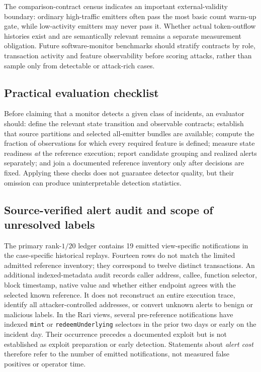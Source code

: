 \documentclass[preprint,12pt,authoryear]{elsarticle}
\begin{document}
The comparison-contract census indicates an important external-validity boundary: ordinary high-traffic emitters often pass the most basic count warm-up gate, while low-activity emitters may never pass it. Whether actual token-outflow histories exist and are semantically relevant remains a separate measurement obligation. Future software-monitor benchmarks should stratify contracts by role, transaction activity and feature observability before scoring attacks, rather than sample only from detectable or attack-rich cases.

\subsection{Practical evaluation checklist}
Before claiming that a monitor detects a given class of incidents, an evaluator should: define the relevant state transition and observable contracts; establish that source partitions and selected all-emitter bundles are available; compute the fraction of observations for which every required feature is defined; measure state readiness \emph{at} the reference execution; report candidate grouping and realized alerts separately; and join a documented reference inventory only after decisions are fixed. Applying these checks does not guarantee detector quality, but their omission can produce uninterpretable detection statistics.

\subsection{Source-verified alert audit and scope of unresolved labels}
The primary rank-$1/20$ ledger contains 19 emitted view-specific notifications in the case-specific historical replays. Fourteen rows do not match the limited admitted reference inventory; they correspond to twelve distinct transactions. An additional indexed-metadata audit records caller address, callee, function selector, block timestamp, native value and whether either endpoint agrees with the selected known reference. It does not reconstruct an entire execution trace, identify all attacker-controlled addresses, or convert unknown alerts to benign or malicious labels. In the Rari views, several pre-reference notifications have indexed \texttt{mint} or \texttt{redeemUnderlying} selectors in the prior two days or early on the incident day. Their occurrence precedes a documented exploit but is not established as exploit preparation or early detection. Statements about \emph{alert cost} therefore refer to the number of emitted notifications, not measured false positives or operator time.
\end{document}
